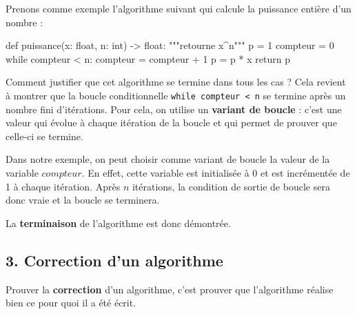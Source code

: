 \documentclass[
  a4paper,
  DIV=11,
  numbers=noendperiod]{scrartcl}
\newenvironment{Shaded}{\begin{snugshade}}{\end{snugshade}}
\newcommand{\BuiltInTok}[1]{\textcolor[rgb]{0.00,0.23,0.31}{#1}}
\newcommand{\CommentTok}[1]{\textcolor[rgb]{0.37,0.37,0.37}{#1}}
\newcommand{\ControlFlowTok}[1]{\textcolor[rgb]{0.00,0.23,0.31}{#1}}
\newcommand{\DecValTok}[1]{\textcolor[rgb]{0.68,0.00,0.00}{#1}}
\newcommand{\KeywordTok}[1]{\textcolor[rgb]{0.00,0.23,0.31}{#1}}
\newcommand{\NormalTok}[1]{\textcolor[rgb]{0.00,0.23,0.31}{#1}}
\newcommand{\OperatorTok}[1]{\textcolor[rgb]{0.37,0.37,0.37}{#1}}
\begin{document}
Prenons comme exemple l'algorithme suivant qui calcule la puissance
entière d'un nombre :

\begin{Shaded}
\begin{Highlighting}[]
\KeywordTok{def}\NormalTok{ puissance(x: }\BuiltInTok{float}\NormalTok{, n: }\BuiltInTok{int}\NormalTok{) }\OperatorTok{{-}\textgreater{}} \BuiltInTok{float}\NormalTok{:}
    \CommentTok{"""retourne x\^{}n"""}
\NormalTok{    p }\OperatorTok{=} \DecValTok{1}
\NormalTok{    compteur }\OperatorTok{=} \DecValTok{0}
    \ControlFlowTok{while}\NormalTok{ compteur }\OperatorTok{\textless{}}\NormalTok{ n:}
\NormalTok{        compteur }\OperatorTok{=}\NormalTok{ compteur }\OperatorTok{+} \DecValTok{1}
\NormalTok{        p }\OperatorTok{=}\NormalTok{ p }\OperatorTok{*}\NormalTok{ x}
    \ControlFlowTok{return}\NormalTok{ p}
\end{Highlighting}
\end{Shaded}

Comment justifier que cet algorithme se termine dans tous les cas ? Cela
revient à montrer que la boucle conditionnelle
\texttt{while\ compteur\ \textless{}\ n} se termine après un nombre fini
d'itérations. Pour cela, on utilise un \textbf{variant de boucle} :
c'est une valeur qui évolue à chaque itération de la boucle et qui
permet de prouver que celle-ci se termine.

Dans notre exemple, on peut choisir comme variant de boucle la valeur de
la variable \(compteur\). En effet, cette variable est initialisée à 0
et est incrémentée de 1 à chaque itération. Après \(n\) itérations, la
condition de sortie de boucle sera donc vraie et la boucle se terminera.

La \textbf{terminaison} de l'algorithme est donc démontrée.

\hypertarget{correction-dun-algorithme}{%
\subsection{3. Correction d'un
algorithme}\label{correction-dun-algorithme}}

\begin{tcolorbox}[enhanced jigsaw, rightrule=.15mm, opacitybacktitle=0.6, bottomrule=.15mm, toprule=.15mm, breakable, colback=white, colframe=quarto-callout-tip-color-frame, left=2mm, leftrule=.75mm, bottomtitle=1mm, titlerule=0mm, coltitle=black, toptitle=1mm, title=\textcolor{quarto-callout-tip-color}{\faLightbulb}\hspace{0.5em}{Définition}, arc=.35mm, opacityback=0, colbacktitle=quarto-callout-tip-color!10!white]

Prouver la \textbf{correction} d'un algorithme, c'est prouver que
l'algorithme réalise bien ce pour quoi il a été écrit.

\end{tcolorbox}
\end{document}
